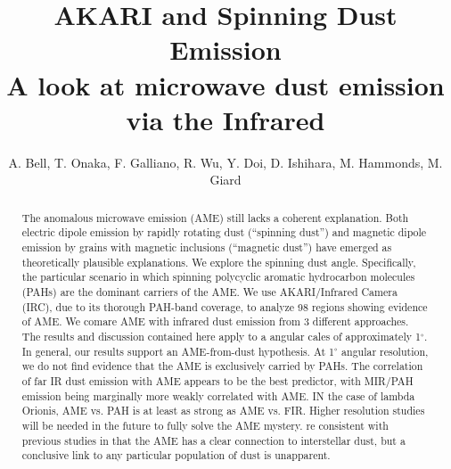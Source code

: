 \documentclass[preprint2,longabstract]{aastex}
\begin{document}

\title{AKARI and Spinning Dust Emission\\
A look at microwave dust emission via the Infrared}



\author{A. Bell, T. Onaka, F. Galliano, R. Wu, Y. Doi, D. Ishihara, M. Hammonds, M. Giard}


\begin{abstract}
The anomalous microwave emission (AME) still lacks a coherent explanation. Both electric dipole emission by rapidly rotating dust (``spinning dust'') and magnetic dipole emission by grains with magnetic inclusions (``magnetic dust'') have emerged as theoretically plausible explanations. We explore the spinning dust angle. Specifically, the particular scenario in which spinning polycyclic aromatic hydrocarbon molecules (PAHs) are the dominant carriers of the AME. We use AKARI/Infrared Camera (IRC), due to its thorough PAH-band coverage, to analyze 98 regions showing evidence of AME.   We comare AME with infrared dust emission from 3 different approaches. The results and discussion contained here apply to a angular cales of approximately 1$^{\circ}$. In general, our results support an AME-from-dust hypothesis. At 1$^{\circ}$ angular resolution, we do not find evidence that the AME is exclusively carried by PAHs. The correlation of far IR dust emission with AME appears to be the best predictor, with MIR/PAH emission being marginally more weakly correlated with AME. IN the case of lambda Orionis, AME vs. PAH is at least as strong as AME vs. FIR. Higher resolution studies will be needed in the future to fully solve the AME mystery. re consistent with previous studies in that the AME has a clear connection to interstellar dust, but a conclusive link to any particular population of dust is unapparent.
\end{abstract}
\end{document}
